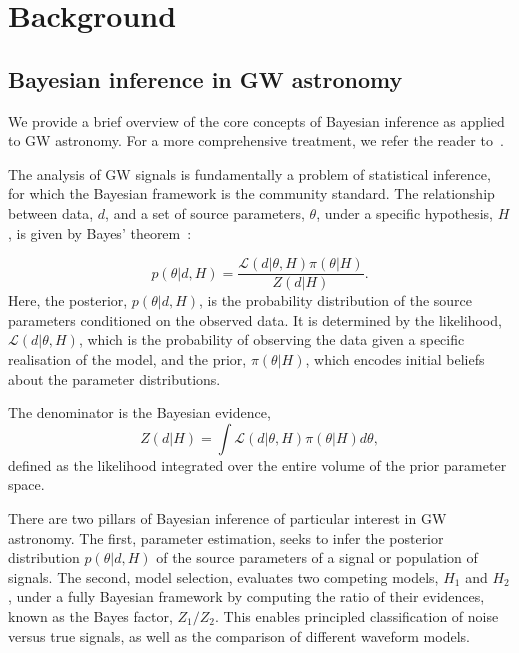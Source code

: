 \documentclass[fleqn,usenatbib]{mnras}
\begin{document}
\section{Background}

\subsection{Bayesian inference in GW astronomy}
\label{sec:background_bayes}
We provide a brief overview of the core concepts of
Bayesian inference as applied to GW astronomy. For a more
comprehensive treatment, we refer the reader to~\cite{skilling, Thrane_2019, lal, bilby_paper, LIGO_guide_signalextraction}.

The analysis of GW signals is fundamentally a problem of statistical
inference, for which the Bayesian framework is the community standard.
The relationship between data, $d$, and a set of source parameters,
$\theta$, under a specific hypothesis, $H$, is given by Bayes' theorem~\citep{Bayes1763}:

\begin{equation}
    p(\theta|d, H) = \frac{\mathcal{L}(d|\theta, H) \pi(\theta|H)}{Z(d|H)}.
    \label{eq:bayes_theorem}
\end{equation}%
Here, the posterior, $p(\theta|d, H)$, is the probability distribution
of the source parameters conditioned on the observed data. It is
determined by the likelihood, $\mathcal{L}(d|\theta, H)$, which is the
probability of observing the data given a specific realisation of the
model, and the prior, $\pi(\theta|H)$, which encodes initial beliefs
about the parameter distributions.

The denominator is the Bayesian evidence,
\begin{equation}
    Z(d|H) = \int \mathcal{L}(d|\theta, H) \pi(\theta|H) d\theta,
    \label{eq:evidence}
\end{equation}
defined as the likelihood integrated over the entire volume of the
prior parameter space.

There are two pillars of Bayesian inference of particular interest
in GW astronomy. The first, parameter estimation, seeks to infer 
the posterior distribution $p(\theta|d, H)$ of the source parameters of a signal or population of signals.
The second, model selection, evaluates two competing
models, $H_1$ and $H_2$, under a fully Bayesian framework by computing the ratio of
their evidences, known as the Bayes factor, $Z_1 / Z_2$. This enables
principled classification of noise versus true signals, as well as the 
comparison of different waveform models.
\end{document}
